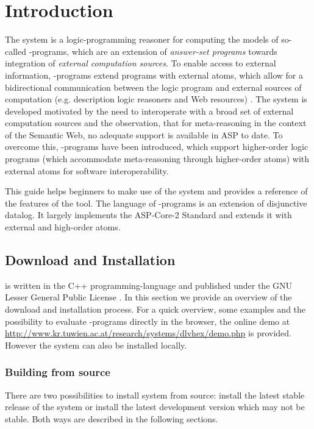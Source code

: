 \documentclass[a4paper, titlepage]{article}
\begin{document}
\tableofcontents
\newpage

\section{Introduction} %
\label{sec:intro}
The \dlvhex{} system is a logic-programming reasoner for 
computing the models of so-called \hex{}-programs, which 
are an extension of \emph{answer-set programs} towards 
integration of \emph{external computation sources}. To 
enable access to external information, \hex{}-programs 
extend programs with external atoms, which allow for a 
bidirectional communication between the logic program and 
external sources of computation (e.g. description logic 
reasoners and Web resources) \cite{efkr2012}. The system is 
developed motivated by the need to interoperate with a 
broad set of external computation sources and the 
observation, that for meta-reasoning in the context of the 
Semantic Web, no adequate support is available in ASP to 
date. To overcome this, \hex{}-programs have been 
introduced, which support higher-order logic programs 
(which accommodate meta-reasoning through higher-order 
atoms) with external atoms for software interoperability.

This guide helps beginners to make use of the system and 
provides a reference of the features of the tool. The language of \hex{}-programs is an extension of disjunctive datalog. It largely 
implements the ASP-Core-2 Standard \cite{cffiklrs2013} and 
extends it with external and high-order atoms. 


\subsection{Download and Installation}
\dlvhex{} is written in the C++ programming-language
and published under the GNU Lesser General 
Public License \cite{licnc}. 
In this section we provide an overview of the 
download and installation process. For a quick overview, 
some examples and the possibility to evaluate 
\hex{}-programs directly in the browser, the online demo at 
\url{http://www.kr.tuwien.ac.at/research/systems/dlvhex/demo.php} 
is provided. However the system can also be installed 
locally. 

\subsubsection{Building from source}
There are two possibilities to install \dlvhex{} system 
from source: install the latest stable release of the 
system or install the latest development version which may 
not be stable. Both ways are described in the following 
sections.  
\end{document}
